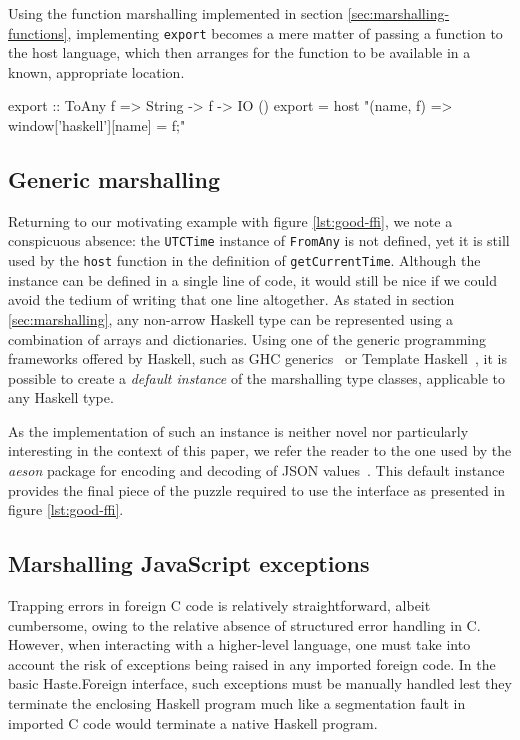 \documentclass{sigplanconf}
\begin{document}
Using the function marshalling implemented in section
\ref{sec:marshalling-functions}, implementing \lstinline!export! becomes a
mere matter of passing a function to the host language, which then
arranges for the function to be available in a known, appropriate location.

\begin{code}
export :: ToAny f => String -> f -> IO ()
export =
  host "(name, f) => window['haskell'][name] = f;"
\end{code}

\subsection{Generic marshalling}
\label{sec:default-instances}
Returning to our motivating example with figure \ref{lst:good-ffi}, we note
a conspicuous absence: the \lstinline!UTCTime! instance of \lstinline!FromAny!
is not defined, yet it is still used by the \lstinline!host! function in the
definition of
\linebreak
\lstinline!getCurrentTime!. Although the instance can be defined
in a single line of code, it would still be nice if we could avoid the tedium
of writing that one line altogether. As stated in section
\ref{sec:marshalling}, any non-arrow Haskell type can be represented using
a combination of arrays and dictionaries. Using one of the generic programming
frameworks offered by Haskell, such as GHC generics\ \cite{generics} or
Template Haskell\ \cite{th}, it is possible to create a \emph{default instance}
of the marshalling type classes, applicable to any Haskell type.

As the implementation of such an instance is neither novel nor particularly
interesting in the context of this paper, we refer the reader to the one
used by the \emph{aeson} package for encoding and decoding of
JSON values\ \cite{aeson}. This default instance provides the final piece
of the puzzle required to use the interface as presented in
figure \ref{lst:good-ffi}.


\subsection{Marshalling JavaScript exceptions}
\label{sec:marshalling-exceptions}
Trapping errors in foreign C code is relatively straightforward, albeit
cumbersome, owing to the relative absence of structured error handling in C.
However, when interacting with a higher-level language, one must take into
account the risk of exceptions being raised in any imported foreign code.
In the basic Haste.Foreign interface, such exceptions must be manually handled
lest they terminate the enclosing Haskell program much like a segmentation
fault in imported C code would terminate a native Haskell program.
\end{document}
